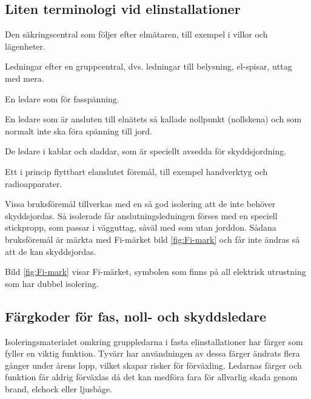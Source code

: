 \subsection{Liten terminologi vid elinstallationer}
\begin{description}[style=nextline]
\item[Gruppcentral] Den säkringscentral som följer efter elmätaren,
  till exempel i villor och lägenheter.

\item[Gruppledningar] Ledningar efter en gruppcentral, dvs.
  ledningar till belysning, el-spisar, uttag med mera.

\item[Fasledare] En ledare som för fasspänning.

\item[Nolledare (N-ledare)] En ledare som är ansluten till elnätets så kallade
  nollpunkt (nollskena) och som normalt inte ska föra spänning till jord.

\item[Skyddsledare (PE-ledare)] De ledare i kablar och sladdar, som är
  speciellt avsedda för skyddsjordning.

\item[Bruksföremål] Ett i princip flyttbart elanslutet föremål,
  till exempel handverktyg och radioapparater.

\item[Förstärkt isolering] Vissa bruksföremål tillverkas med en så god
  isolering att de inte behöver skyddsjordas.
  Så isolerade får anslutningsledningen förses med en speciell stickpropp,
  som passar i vägguttag, såväl med som utan jorddon.
  Sådana bruksföremål är märkta med Fi-märket bild \ref{fig:Fi-mark} och får
  inte ändras så att de kan skyddsjordas.
\end{description}


Bild \ref{fig:Fi-mark} visar Fi-märket, symbolen som finns på all elektrisk
utrustning som har dubbel isolering.

\subsection{Färgkoder för fas, noll- och skyddsledare}

Isoleringsmaterialet omkring gruppledarna i fasta elinstallationer har
färger som fyller en viktig funktion.
Tyvärr har användningen av dessa färger ändrats flera gånger under årens lopp,
vilket skapar risker för förväxling.
Ledarnas färger och funktion får aldrig förväxlas då det kan medföra fara för
allvarlig skada genom brand, elchock eller ljusbåge.


